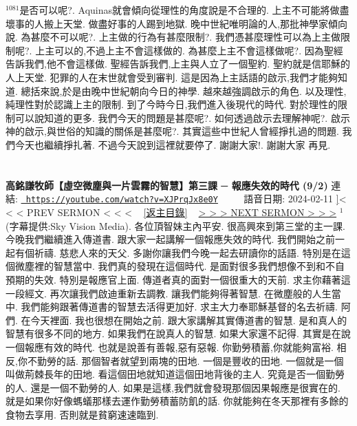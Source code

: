 \documentclass{book}
\begin{document}
$^{1081}$是否可以呢?.
Aquinas就會傾向從理性的角度說是不合理的.
上主不可能將做盡壞事的人搬上天堂.
做盡好事的人踢到地獄.
晚中世紀唯明論的人,那批神學家傾向說.
為甚麼不可以呢?.
上主做的行為有甚麼限制?.
我們憑甚麼理性可以為上主做限制呢?.
上主可以的,不過上主不會這樣做的.
為甚麼上主不會這樣做呢?.
因為聖經告訴我們,他不會這樣做.
聖經告訴我們,上主與人立了一個聖約.
聖約就是信耶穌的人上天堂.
犯罪的人在末世就會受到審判.
這是因為上主話語的啟示,我們才能夠知道.
總括來說,於是由晚中世紀朝向今日的神學.
越來越強調啟示的角色.
以及理性,純理性對於認識上主的限制.
到了今時今日,我們進入後現代的時代.
對於理性的限制可以說知道的更多.
我們今天的問題是甚麼呢?.
如何透過啟示去理解神呢?.
啟示神的啟示,與世俗的知識的關係是甚麼呢?.
其實這些中世紀人曾經掙扎過的問題.
我們今天也繼續掙扎著.
不過今天說到這裡就要停了.
謝謝大家!.
謝謝大家 再見.
\newpage



\section{}
\label{sec:XJPrqJx8e0Y}
\textbf{高銘謙牧師【虛空微塵與一片雲霧的智慧】第三課 ─ 報應失效的時代 (9/2)}
\newline
\newline
連結: \href{https://youtube.com/watch?v=XJPrqJx8e0Y}{\texttt{ https://youtube.com/watch?v=XJPrqJx8e0Y}} ~~~~ 語音日期: 2024-02-11 
\newline
\newline
\hyperref[sec:nPtT6PycYE]]{\small{< < < PREV SERMON < < <}}
~
\hyperref[sec:index]{\small{[返主目錄]}}
~
\hyperref[sec:3IzV5i5HZqA]{\small{> > > NEXT SERMON > > >}}
\newline
\newline
$^{1}$(字幕提供:Sky Vision Media).
各位頂智妹主內平安.
很高興來到第三堂的主一課.
今晚我們繼續進入傳道書.
跟大家一起講解一個報應失效的時代.
我們開始之前一起有個祈禱.
慈悲人來的天父.
多謝你讓我們今晚一起去研讀你的話語.
特別是在這個微塵裡的智慧當中.
我們真的發現在這個時代.
是面對很多我們想像不到和不自預期的失效.
特別是報應官上面.
傳道者真的面對一個很重大的天前.
求主你藉著這一段經文.
再次讓我們啟迪重新去調教.
讓我們能夠得著智慧.
在微塵般的人生當中.
我們能夠跟著傳道書的智慧去活得更加好.
求主大力奉耶穌基督的名去祈禱.
阿們.
在今天裡面.
我也很想在開始之前.
跟大家講解其實傳道書的智慧.
是和真人的智慧有很多不同的地方.
如果我們在說真人的智慧.
如果大家還不記得.
其實是在說一個報應有效的時代.
也就是說善有善報,惡有惡報.
你勤勞積蓄,你就能夠富裕.
相反,你不勤勞的話.
那個智者就望到兩塊的田地.
一個是豐收的田地.
一個就是一個叫做荊棘長年的田地.
看這個田地就知道這個田地背後的主人.
究竟是否一個勤勞的人.
還是一個不勤勞的人.
如果是這樣,我們就會發現那個因果報應是很實在的.
就是如果你好像螞蟻那樣去運作勤勞積蓄防飢的話.
你就能夠在冬天那裡有多餘的食物去享用.
否則就是貧窮速速臨到.
\end{document}
